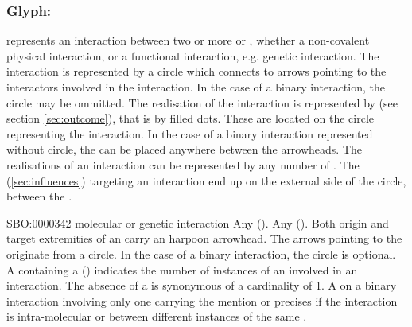 
\subsubsection{Glyph: }\label{sec:interaction}

 represents an interaction between two or more  or , whether a non-covalent physical interaction, or a functional interaction, e.g. genetic interaction. The interaction is represented by a circle which connects to arrows pointing to the interactors involved in the interaction. In the case of a binary interaction, the circle may be ommitted. The realisation of the interaction is represented by  (see section \ref{sec:outcome}), that is by filled dots. These  are located on the circle representing the interaction. In the case of a binary interaction represented without circle, the  can be placed anywhere between the arrowheads. The realisations of an interaction can be represented by any number of . The  (\ref{sec:influences}) targeting an interaction end up on the external side of the circle, between the .

\begin{glyphDescription}
 \glyphSboTerm SBO:0000342 molecular or genetic interaction
 \glyphOrigin Any  ().
 \glyphTarget Any  ().
 \glyphEndPoint Both origin and target extremities of an  carry an harpoon arrowhead. The arrows pointing to the  originate from a circle. In the case of a binary interaction, the circle is optional. 
 \glyphAux A  containing a  () indicates the number of instances of an  involved in an interaction. The absence of a  is synonymous of a cardinality of 1. A  on a binary interaction involving only one  carrying the mention  or  precises if the interaction is intra-molecular  or between different instances of the same .
 \end{glyphDescription}


